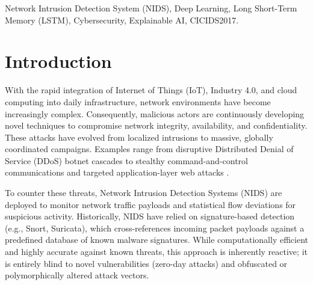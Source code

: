 \documentclass[conference]{IEEEtran}
\begin{document}
\begin{abstract}
The exponential growth of internet traffic has led to a proportional increase in sophistication and volume of cybersecurity threats. Traditional signature-based Network Intrusion Detection Systems (NIDS) struggle to identify zero-day attacks and complex intrusion patterns, necessitating the shift towards anomaly-based models. In this paper, we propose a real-time, explainable Network Intrusion Detection System utilizing a deep sequence-based Long Short-Term Memory (LSTM) neural network. Trained on the comprehensive CICIDS2017 dataset, the proposed architecture maps granular threats into six robust macro-classes: BENIGN, FLOODING, SCANNING, BOTNET, BRUTE\_FORCE, and WEB\_ATTACK. To address the fundamental "black box" limitation of deep learning in critical security infrastructure, we integrate a deterministic feature-based explainability engine. This engine provides human-readable context for each detected threat, categorizing the severity and exposing the underlying statistical reasons behind the classification based on real-time extracted flow metrics. The system achieves high accuracy on test data, outperforming baseline models, and demonstrates a fully functional pipeline from real-time dynamic packet capture via tshark to explainable, real-time threat alerting.
\end{abstract}

\begin{IEEEkeywords}
Network Intrusion Detection System (NIDS), Deep Learning, Long Short-Term Memory (LSTM), Cybersecurity, Explainable AI, CICIDS2017.
\end{IEEEkeywords}

\section{Introduction}
With the rapid integration of Internet of Things (IoT), Industry 4.0, and cloud computing into daily infrastructure, network environments have become increasingly complex. Consequently, malicious actors are continuously developing novel techniques to compromise network integrity, availability, and confidentiality. These attacks have evolved from localized intrusions to massive, globally coordinated campaigns. Examples range from disruptive Distributed Denial of Service (DDoS) botnet cascades to stealthy command-and-control communications and targeted application-layer web attacks \cite{cicids2017}.

To counter these threats, Network Intrusion Detection Systems (NIDS) are deployed to monitor network traffic payloads and statistical flow deviations for suspicious activity. Historically, NIDS have relied on signature-based detection (e.g., Snort, Suricata), which cross-references incoming packet payloads against a predefined database of known malware signatures. While computationally efficient and highly accurate against known threats, this approach is inherently reactive; it is entirely blind to novel vulnerabilities (zero-day attacks) and obfuscated or polymorphically altered attack vectors. 
\end{document}
